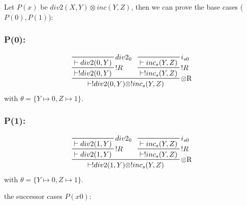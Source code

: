 \documentclass[sigconf]{acmart}
\begin{document}
Let $P(x)$ be $div2(X, Y)\otimes inc(Y, Z)$, then we can prove the base cases ($P(0), P(1)$):

\subsubsection*{P(0):}
\begin{eqnarray}
  \prftree[r]
    {$\otimes$R}
    {
      \prftree[r] {$!R$}
      {
        \prftree[r] {$div2_{0}$}
        { \vdash div2(0, Y) }
      }
      { \vdash !div2(0, Y) }
    }
    {
      \prftree[r]{$!R$}
      {
        \prftree[r] {$i_{s0}$}
        { \vdash inc_s(Y, Z) }
      }
      { \vdash !inc_s(Y, Z) }
    }
    {\vdash !div2(0, Y)\otimes !inc_s(Y, Z) }
\end{eqnarray}
with $\theta = \{Y\mapsto 0, Z\mapsto 1\}$.


\subsubsection*{P(1):}
\begin{eqnarray}
  \prftree[r]
    {$\otimes$R}
    {
      \prftree[r]{$!R$}
      {
        \prftree[r] {$div2_{0}$}
        { \vdash div2(1, Y) }
      }
      { \vdash div2(1, Y) }
    }
    {
      \prftree[r]{$!R$}
      {
        \prftree[r] {$i_{s0}$}
        { \vdash inc_s(Y, Z) }
      }
      { \vdash !inc_s(Y, Z) }
    }
    {\vdash !div2(1, Y)\otimes !inc_s(Y, Z) }
\end{eqnarray}
with $\theta = \{Y\mapsto 0, Z\mapsto 1\}$.

the successor cases $P(x0)$:
\end{document}
